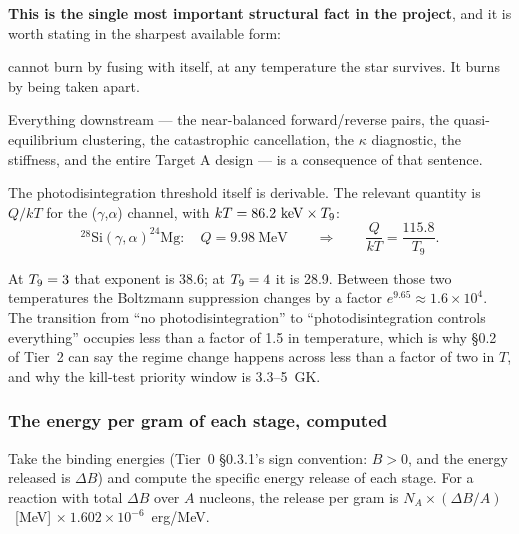 \textbf{This is the single most important structural fact in the project}, and
it is worth stating in the sharpest available form:

\begin{invariant}
 cannot burn by fusing with itself, at any temperature the star
survives. It burns by being taken apart.
\end{invariant}

Everything downstream --- the near-balanced forward/reverse pairs, the
quasi-equilibrium clustering, the catastrophic cancellation, the $\kappa$
diagnostic, the stiffness, and the entire Target A design --- is a consequence
of that sentence.

The photodisintegration threshold itself is derivable. The relevant quantity is
$Q/kT$ for the ($\gamma$,$\alpha$) channel, with $kT = 86.2~\mathrm{keV} \times
T_{9}$:
%
\begin{equation}
{}^{28}\mathrm{Si}(\gamma,\alpha)^{24}\mathrm{Mg}: \quad Q = 9.98\ \mathrm{MeV}
\qquad\Longrightarrow\qquad
\frac{Q}{kT} = \frac{115.8}{T_9}.
\label{eq:photothreshold}
\end{equation}

At $T_{9} = 3$ that exponent is 38.6; at $T_{9} = 4$ it is 28.9.
\derivedhere[Q from the AME2020 mass excesses
($S_\alpha(\nuc{Si}{28}) = 9.984$~MeV), Tier~0 \S0.3.1] Between those two
temperatures the Boltzmann suppression changes by a factor
$e^{9.65} \approx 1.6 \times 10^4$. The transition from ``no
photodisintegration'' to ``photodisintegration controls everything'' occupies
less than a factor of 1.5 in temperature, which is why \S0.2 of Tier~2 can say
the regime change happens across less than a factor of two in $T$, and why the
kill-test priority window is 3.3--5~GK.

\subsubsection{The energy per gram of each stage, computed}
\label{sec:energypergram}

Take the binding energies (Tier~0 \S0.3.1's sign convention: $B > 0$, and the
energy released is $\Delta B$) and compute the specific energy release of each
stage. For a reaction with total $\Delta B$ over $A$ nucleons, the release per
gram is $N_A \times (\Delta B/A)$~[MeV] $\times\ 1.602 \times 10^{-6}$~erg/MeV.

